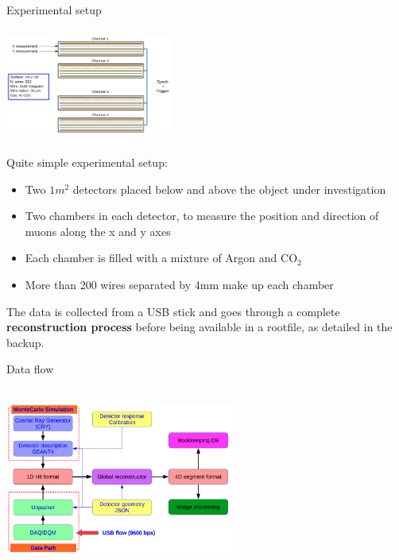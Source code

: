 \documentclass[8 pt]{beamer}
\begin{document}
\begin{frame}{Experimental setup}
\justifying
\begin{minipage}[c]{.50\textwidth}
\includegraphics[width=5.5cm, height=3.7cm]{figs/muonChambers.png}
\end{minipage} \hfill
\begin{minipage}[c]{.49\textwidth}
\justifying
Quite simple experimental setup:
\begin{itemize}
\justifying
\item Two $1m^2$ detectors placed below and above the object under investigation
\item Two chambers in each detector, to measure the position and direction of muons along the x and y axes
\item Each chamber is filled with a mixture of Argon and CO$_2$
\item More than 200 wires separated by 4mm make up each chamber
\end{itemize}
\end{minipage} \hfill  \vfill

The data is collected from a USB stick and goes through a complete \textbf{\alert{reconstruction process}} before being available in a rootfile, as detailed in the backup. \vfill
\end{frame}

\begin{frame}{Data flow}
\begin{center}
\includegraphics[width=7.5cm, height=6cm]{figs/dataFlow.png}
\end{center}
\end{frame}
\end{document}
